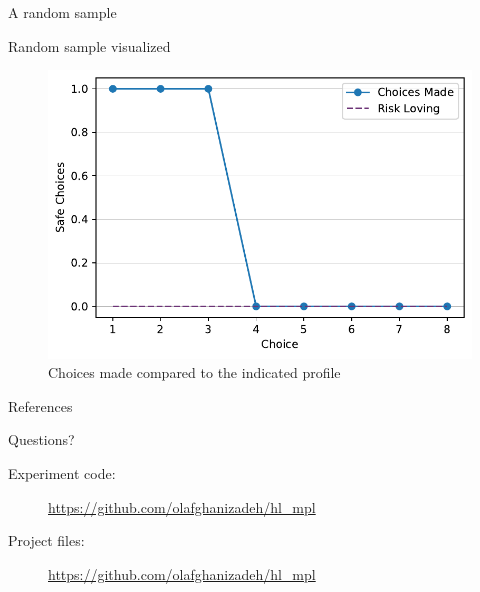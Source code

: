 \documentclass[10pt]{beamer}
\begin{document}
\begin{frame}{A random sample}
  \resizebox{\textwidth}{!}{
    
  }
\end{frame}

\begin{frame}{Random sample visualized}
  \begin{figure}[H]
  \includegraphics[width=0.9\columnwidth]{graphics/random_plot.pdf}
  \caption{Choices made compared to the indicated profile}
\end{figure}
\end{frame}

\begin{frame}
  \Huge
\end{frame}












\begin{frame}{References}
  \printbibliography[heading=none]
\end{frame}




{
\begin{frame}[standout]
  Questions?
  \begin{description}
      \item[Experiment code:] \url{https://github.com/olafghanizadeh/hl_mpl}
      \item[Project files:] \url{https://github.com/olafghanizadeh/hl_mpl}
  \end{description}
\end{frame}
}
\end{document}
